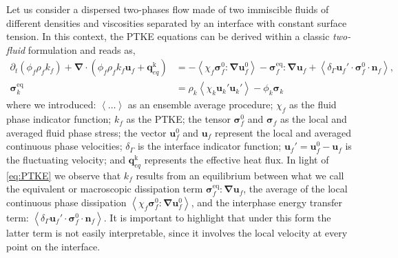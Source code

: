 \documentclass[12pt,a4paper]{article}
\newcommand{\avg}[1]{\left<#1\right>}
\renewcommand{\avg}[1]{\left<#1\right>}
\newcommand{\grad}{\mathbf{\nabla}}
\renewcommand{\div}{\mathbf{\nabla}\cdot}
\newcommand{\pddt}{\frac{\partial}{\partial t}}
\renewcommand{\pddt}{\partial_t}
\begin{document}
Let us consider a dispersed two-phases flow made of two immiscible fluids of different densities and viscosities separated by an interface with constant surface tension.
In this context, the PTKE equations can be derived within a classic \textit{two-fluid} formulation and reads as, 
\begin{align}
    \pddt (\phi_f\rho_fk_f)  
    + \div (
        \phi_f\rho_fk_f\textbf{u}_f
        + \textbf{q}_{eq}^\text{k} 
        )
    &= 
    - \avg{\chi_f\bm{\sigma}_f^0 : \grad \textbf{u}_f^0}
    - \bm{\sigma}_f^\text{eq} : \grad \textbf{u}_f
    + \avg{\delta_\Gamma \textbf{u}_f' \cdot \bm{\sigma}_f^0 \cdot \textbf{n}_f},
    \label{eq:PTKE}
    \\
    \bm{\sigma}_k^\text{eq}
    &= 
     \rho_k\avg{\chi_k \textbf{u}_k'\textbf{u}_k'}
      - \phi_k \bm{\sigma}_k \nonumber
\end{align}
where we introduced: $\avg{\ldots}$ as an ensemble average procedure; $\chi_f$ as the fluid phase indicator function; $k_f$ as the PTKE; the tensor $\bm\sigma_f^0$ and $\bm\sigma_f$ as the local and averaged fluid phase stress; the vector $\textbf{u}_f^0$ and $\textbf{u}_f$ represent the local and averaged continuous phase velocities; $\delta_\Gamma$ is the interface indicator function; $\textbf{u}_f' = \textbf{u}_f^0 - \textbf{u}_f$ is the fluctuating velocity; and $\textbf{q}_{eq}^\text{k}$ represents the effective heat flux. 
In light of \eqref{eq:PTKE} we observe that $k_f$ results from an equilibrium between what we call the equivalent or macroscopic dissipation term $\bm{\sigma}_f^\text{eq} : \grad \textbf{u}_f$, the average of the local continuous phase dissipation $\avg{\chi_f\bm{\sigma}_f^0 : \grad \textbf{u}_f^0}$, and the interphase energy transfer term: $\avg{\delta_\Gamma \textbf{u}_f' \cdot \bm{\sigma}_f^0 \cdot \textbf{n}_f}$. 
It is important to highlight that under this form the latter term is not easily interpretable, since it involves the local velocity at every point on the interface. 

\end{document}
